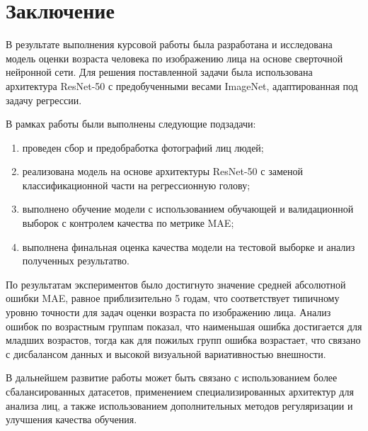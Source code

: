 \chapter*{Заключение}

В результате выполнения курсовой работы была разработана и исследована модель оценки возраста человека по изображению лица на основе сверточной нейронной сети. Для решения поставленной задачи была использована архитектура ResNet-50 с предобученными весами ImageNet, адаптированная под задачу регрессии.

В рамках работы были выполнены следующие подзадачи:
\begin{enumerate}
	\item проведен сбор и предобработка фотографий лиц людей;
	\item реализована модель на основе архитектуры ResNet-50 с заменой классификационной части на регрессионную голову;
	\item выполнено обучение модели с использованием обучающей и валидационной выборок с контролем качества по метрике MAE;
	\item выполнена финальная оценка качества модели на тестовой выборке и анализ полученных результатво.
\end{enumerate}

По результатам экспериментов было достигнуто значение средней абсолютной ошибки MAE, равное приблизительно 5 годам, что соответствует типичному уровню точности для задач оценки возраста по изображению лица. Анализ ошибок по возрастным группам показал, что наименьшая ошибка достигается для младших возрастов, тогда как для пожилых групп ошибка возрастает, что связано с дисбалансом данных и высокой визуальной вариативностью внешности.

В дальнейшем развитие работы может быть связано с использованием более сбалансированных датасетов, применением специализированных архитектур для анализа лиц, а также использованием дополнительных методов регуляризации и улучшения качества обучения.